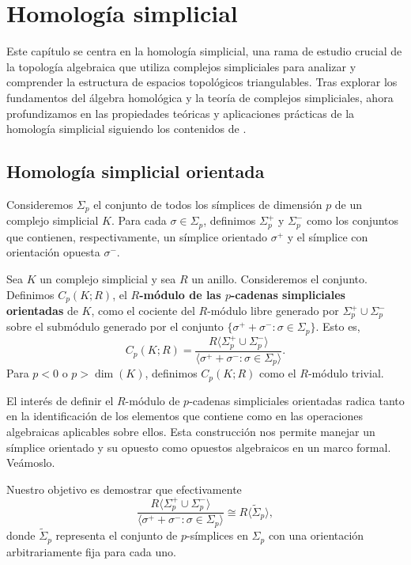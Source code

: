 
\chapter{Homología simplicial}

Este capítulo se centra en la homología simplicial, una rama de estudio crucial
de la topología algebraica que utiliza complejos simpliciales para analizar y
comprender la estructura de espacios topológicos triangulables. Tras explorar los
fundamentos del álgebra homológica y la teoría de complejos simpliciales, ahora
profundizamos en las propiedades teóricas y aplicaciones prácticas de la
homología simplicial siguiendo los contenidos de \cite{rafael2003elementos}.

\section{Homología simplicial orientada}
Consideremos $\Sigma_{p}$ el conjunto de todos los símplices de dimensión $p$ de
un complejo simplicial $K$. Para cada $\sigma \in \Sigma_{p}$, definimos
$\Sigma_{p}^{+}$ y $\Sigma_{p}^{-}$ como los conjuntos que contienen, respectivamente,
un símplice orientado $\sigma^{+}$ y el símplice con orientación opuesta
$\sigma^{-}$.
\begin{definicion}
	Sea $K$ un complejo simplicial y sea $R$ un anillo. Consideremos el conjunto. Definimos
	$C_{p}(K;R)$, el \textbf{$R$-módulo de las $p$-cadenas simpliciales orientadas}
	de $K$, como el cociente del $R$-módulo libre generado por
	$\Sigma_{p}^{+}\cup \Sigma_{p}^{-}$ sobre el submódulo generado por el
	conjunto $\{\sigma^{+}+ \sigma^{-}: \sigma \in \Sigma_{p}\}$. Esto es,
	\[
	C_{p}(K;R) = \frac{R\langle \Sigma_{p}^{+}\cup \Sigma_{p}^{-}\rangle}{\langle
		\sigma^{+}+ \sigma^{-}: \sigma \in \Sigma_{p}\rangle}.
	\]
	Para $p < 0$ o $p > \dim(K)$, definimos $C_{p}(K;R)$ como el $R$-módulo trivial.
\end{definicion}
El interés de definir el $R$-módulo de $p$-cadenas simpliciales orientadas radica
tanto en la identificación de los elementos que contiene como en las operaciones
algebraicas aplicables sobre ellos. Esta construcción nos permite manejar un
símplice orientado y su opuesto como opuestos algebraicos en un marco formal. Veámoslo.

Nuestro objetivo es demostrar que efectivamente
\[
\frac{R\langle \Sigma_{p}^{+}\cup \Sigma_{p}^{-}\rangle}{\langle \sigma^{+}+
	\sigma^{-}: \sigma \in \Sigma_{p}\rangle}\cong R \langle \tilde{\Sigma}_{p}\rangle
,
\]
donde $\tilde{\Sigma}_{p}$ representa el conjunto de $p$-símplices en $\Sigma_{p}$
con una orientación arbitrariamente fija para cada uno.

